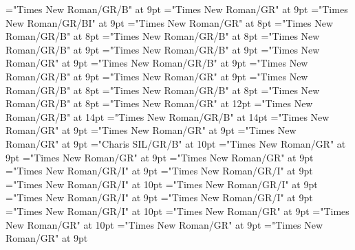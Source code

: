 \documentclass[gps1,twoside]{article}
\begin{document}
\font\xitemxitemcrossrefbefore="Times New Roman/GR/B" at 9pt
\font\xitemxitemcrossreftargetsbefore="Times New Roman/GR" at 9pt
\font\xitemxitemcrossreftypebefore="Times New Roman/GR/BI" at 9pt
\font\xitemxitemexamplebefore="Times New Roman/GR" at 8pt
\font\xitemxitemheadwordbefore="Times New Roman/GR/B" at 8pt
\font\xitemxitemheadwordminorbefore="Times New Roman/GR/B" at 8pt
\font\xitemxitemmainentryrefbefore="Times New Roman/GR/B" at 9pt
\font\xitemxitemmainentryrefminorbefore="Times New Roman/GR/B" at 9pt
\font\xitemxitempronunciationminorbefore="Times New Roman/GR" at 9pt
\font\xitemxitemsensecrossrefbefore="Times New Roman/GR/B" at 9pt
\font\xitemxitemsensemainentryrefbefore="Times New Roman/GR/B" at 9pt
\font\xitemxitemtranslationbefore="Times New Roman/GR" at 9pt
\font\xitemxitemheadwordsubbefore="Times New Roman/GR/B" at 8pt
\font\xitemxitemLexEntrypublishRootMinorPrimaryTargetMLHeadWordPubbefore="Times New Roman/GR/B" at 8pt
\font\xitemxitemLexEntrypublishStemMinorPrimaryTargetMLHeadWordPubbefore="Times New Roman/GR/B" at 8pt
\font\xitemtpi="Times New Roman/GR" at 12pt
\font{}="Times New Roman/GR/B" at 14pt
\font{}="Times New Roman/GR/B" at 14pt
\font{}="Times New Roman/GR" at 9pt
\font\entryletData="Times New Roman/GR" at 9pt
\font\mainheadwordentryletData="Times New Roman/GR" at 9pt
\font\spanbzhmainheadwordentryletData="Charis SIL/GR/B" at 10pt
\font\sensesentryletData="Times New Roman/GR" at 9pt
\font\sensecontentsensesentryletData="Times New Roman/GR" at 9pt
\font\sensesensecontentsensesentryletData="Times New Roman/GR" at 9pt
\font\morphosyntaxanalysissensesensecontentsensesentryletData="Times New Roman/GR/I" at 9pt
\font\partofspeechmorphosyntaxanalysissensesensecontentsensesentryletData="Times New Roman/GR/I" at 9pt
\font\spanenpartofspeechmorphosyntaxanalysissensesensecontentsensesentryletData="Times New Roman/GR/I" at 10pt
\font\slotsmorphosyntaxanalysissensesensecontentsensesentryletData="Times New Roman/GR/I" at 9pt
\font\slotslotsmorphosyntaxanalysissensesensecontentsensesentryletData="Times New Roman/GR/I" at 9pt
\font\nameslotslotsmorphosyntaxanalysissensesensecontentsensesentryletData="Times New Roman/GR/I" at 9pt
\font\spanennameslotslotsmorphosyntaxanalysissensesensecontentsensesentryletData="Times New Roman/GR/I" at 10pt
\font{}="Times New Roman/GR" at 9pt
\font\spanendefinitionorglosssensesensecontentsensesentryletData="Times New Roman/GR" at 10pt
\font\pronunciationsentryletData="Times New Roman/GR" at 9pt
\font\pronunciationpronunciationsentryletData="Times New Roman/GR" at 9pt
\end{document}
